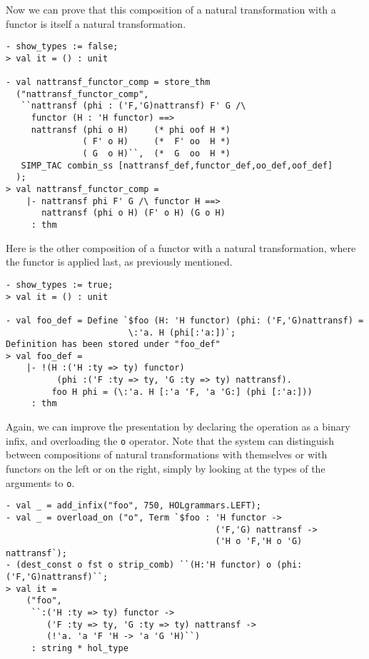 Now we can prove that this composition of a natural transformation with
a functor is itself a natural transformation.
\begin{session}
\begin{verbatim}
- show_types := false;
> val it = () : unit

- val nattransf_functor_comp = store_thm
  ("nattransf_functor_comp",
   ``nattransf (phi : ('F,'G)nattransf) F' G /\
     functor (H : 'H functor) ==>
     nattransf (phi o H)     (* phi oof H *)
               ( F' o H)     (*  F' oo  H *)
               ( G  o H)``,  (*  G  oo  H *)
   SIMP_TAC combin_ss [nattransf_def,functor_def,oo_def,oof_def]
  );
> val nattransf_functor_comp =
    |- nattransf phi F' G /\ functor H ==>
       nattransf (phi o H) (F' o H) (G o H)
     : thm
\end{verbatim}
\end{session}

Here is the other composition of a functor with a natural transformation, where
the functor is applied last, as previously mentioned.
\begin{session}
\begin{verbatim}
- show_types := true;
> val it = () : unit

- val foo_def = Define `$foo (H: 'H functor) (phi: ('F,'G)nattransf) =
                        \:'a. H (phi[:'a:])`;
Definition has been stored under "foo_def"
> val foo_def =
    |- !(H :('H :ty => ty) functor)
          (phi :('F :ty => ty, 'G :ty => ty) nattransf).
         foo H phi = (\:'a. H [:'a 'F, 'a 'G:] (phi [:'a:]))
     : thm
\end{verbatim}
\end{session}

Again, we can improve the presentation by declaring the operation as a binary
infix, and overloading the \texttt{o} operator. Note that the \HOLW{} system
can distinguish between compositions of natural transformations with themselves
or with functors on the left or on the right, simply by looking at the types
of the arguments to \texttt{o}.
\begin{session}
\begin{verbatim}
- val _ = add_infix("foo", 750, HOLgrammars.LEFT);
- val _ = overload_on ("o", Term `$foo : 'H functor ->
                                         ('F,'G) nattransf ->
                                         ('H o 'F,'H o 'G) nattransf`);
- (dest_const o fst o strip_comb) ``(H:'H functor) o (phi:('F,'G)nattransf)``;
> val it =
    ("foo",
     ``:('H :ty => ty) functor ->
        ('F :ty => ty, 'G :ty => ty) nattransf ->
        (!'a. 'a 'F 'H -> 'a 'G 'H)``)
     : string * hol_type
\end{verbatim}
\end{session}


